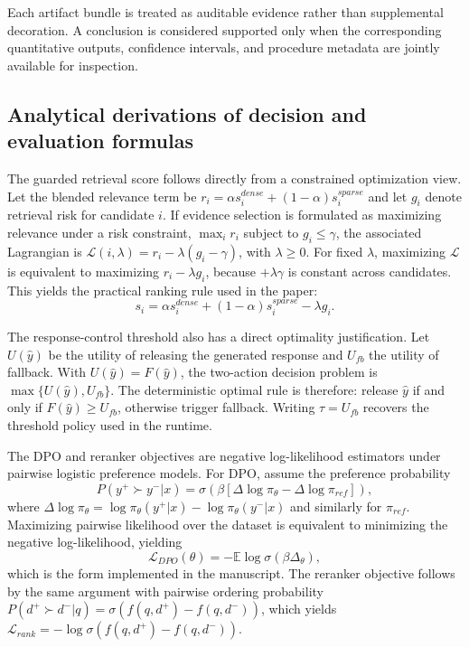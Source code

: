﻿\documentclass[a4paper,12pt]{article}
\begin{document}
Each artifact bundle is treated as auditable evidence rather than supplemental decoration. A conclusion is considered supported only when the corresponding quantitative outputs, confidence intervals, and procedure metadata are jointly available for inspection.

\subsection{Analytical derivations of decision and evaluation formulas}
The guarded retrieval score follows directly from a constrained optimization view. Let the blended relevance term be \(r_i=\alpha s_i^{dense}+(1-\alpha)s_i^{sparse}\) and let \(g_i\) denote retrieval risk for candidate \(i\). If evidence selection is formulated as maximizing relevance under a risk constraint, \(\max_i r_i\) subject to \(g_i\le\gamma\), the associated Lagrangian is \(\mathcal{L}(i,\lambda)=r_i-\lambda(g_i-\gamma)\), with \(\lambda\ge0\). For fixed \(\lambda\), maximizing \(\mathcal{L}\) is equivalent to maximizing \(r_i-\lambda g_i\), because \(+\lambda\gamma\) is constant across candidates. This yields the practical ranking rule used in the paper:
\begin{equation}
s_i=\alpha s_i^{dense}+(1-\alpha)s_i^{sparse}-\lambda g_i.
\end{equation}

The response-control threshold also has a direct optimality justification. Let \(U(\hat{y})\) be the utility of releasing the generated response and \(U_{fb}\) the utility of fallback. With \(U(\hat{y})=F(\hat{y})\), the two-action decision problem is \(\max\{U(\hat{y}),U_{fb}\}\). The deterministic optimal rule is therefore: release \(\hat{y}\) if and only if \(F(\hat{y})\ge U_{fb}\), otherwise trigger fallback. Writing \(\tau=U_{fb}\) recovers the threshold policy used in the runtime.

The DPO and reranker objectives are negative log-likelihood estimators under pairwise logistic preference models. For DPO, assume the preference probability
\begin{equation}
P(y^+\succ y^-|x)=\sigma\!\left(\beta\left[\Delta\log\pi_\theta-\Delta\log\pi_{ref}\right]\right),
\end{equation}
where \(\Delta\log\pi_\theta=\log\pi_\theta(y^+|x)-\log\pi_\theta(y^-|x)\) and similarly for \(\pi_{ref}\). Maximizing pairwise likelihood over the dataset is equivalent to minimizing the negative log-likelihood, yielding
\begin{equation}
\mathcal{L}_{DPO}(\theta)=-\mathbb{E}\log \sigma\!\left(\beta\Delta_\theta\right),
\end{equation}
which is the form implemented in the manuscript. The reranker objective follows by the same argument with pairwise ordering probability \(P(d^+\succ d^-|q)=\sigma(f(q,d^+)-f(q,d^-))\), which yields \(\mathcal{L}_{rank}=-\log \sigma(f(q,d^+)-f(q,d^-))\).
\end{document}
